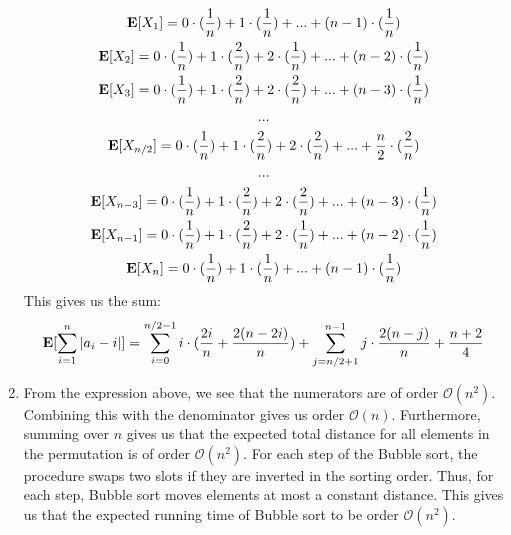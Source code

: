 \documentclass[12pt]{article}%
\begin{document}
\begin{enumerate}
\begin{gather*}
  {\bf E}[X_1] = 0\cdot(\frac{1}{n}) + 1 \cdot (\frac{1}{n}) + ... + (n-1) \cdot (\frac{1}{n}) \\
  {\bf E}[X_2] = 0\cdot(\frac{1}{n}) + 1 \cdot (\frac{2}{n}) + 2 \cdot (\frac{1}{n}) + ... + (n-2) \cdot (\frac{1}{n}) \\
  {\bf E}[X_3] = 0\cdot(\frac{1}{n}) + 1 \cdot (\frac{2}{n}) + 2 \cdot (\frac{2}{n}) + ... + (n-3) \cdot (\frac{1}{n}) \\
  ... \\
  {\bf E}[X_{n/2}] = 0\cdot(\frac{1}{n}) + 1 \cdot (\frac{2}{n}) + 2 \cdot (\frac{2}{n}) + ... + \frac{n}{2} \cdot (\frac{2}{n}) \\
  ... \\
  {\bf E}[X_{n-3}] = 0\cdot(\frac{1}{n}) + 1 \cdot (\frac{2}{n}) + 2 \cdot (\frac{2}{n}) + ... + (n-3) \cdot (\frac{1}{n}) \\
  {\bf E}[X_{n-1}] = 0\cdot(\frac{1}{n}) + 1 \cdot (\frac{2}{n}) + 2 \cdot (\frac{1}{n}) + ... + (n-2) \cdot (\frac{1}{n}) \\
    {\bf E}[X_n] = 0\cdot(\frac{1}{n}) + 1 \cdot (\frac{1}{n}) + ... + (n-1) \cdot (\frac{1}{n})
\end{gather*}
This gives us the sum:
$${\bf E}[\sum_{i=1}^n |a_i - i|] = \sum_{i=0}^{n/2-1} i\cdot(\frac{2i}{n} + \frac{2(n-2i)}{n}) + \sum_{j = n/2+1}^{n-1} j \cdot \frac{2(n-j)}{n} + \frac{n+2}{4}$$
\item From the expression above, we see that the numerators are of order $\mathcal{O}(n^2)$. Combining this with the denominator gives us order $\mathcal{O}(n)$. Furthermore, summing over $n$ gives us that the expected total distance for all elements in the permutation is of order $\mathcal{O}(n^2)$. For each step of the Bubble sort, the procedure swaps two slots if they are inverted in the sorting order. Thus, for each step, Bubble sort moves elements at most a constant distance. This gives us that the expected running time of Bubble sort to be order $\mathcal{O}(n^2)$.
\end{enumerate}
\end{document}
